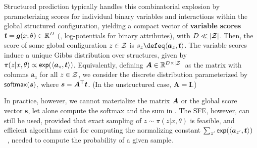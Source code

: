 Structured prediction typically handles this combinatorial explosion
by parameterizing scores for individual binary variables and
interactions within the global structured configuration, yielding a
compact vector of \textbf{variable scores} $\bm{t} = \g(x; \theta)
        \in \mathbb{R}^D$ (\eg, log-potentials for binary attributes), with
$D \ll |\ZZ|$. Then, the score of some global configuration $z \in
        \ZZ$ is $s_z \defeq \DP{\bm{a}_z}{\bm{t}}$. The variable scores
induce a unique Gibbs distribution over structures, given by
$\pi(z|x,\theta) \propto \exp(\DP{\bm{a}_{z}}{\bm{t}})$.
Equivalently, defining $\bm{A} \in \mathbb{R}^{D \times |\ZZ|}$ as
the matrix with columns $\bm{a}_{z}$ for all $z \in \ZZ$, we consider
the discrete distribution parameterized by $\softmax(\s)$, where
$\s=\bm{A}^\top \bm{t}$. (In the unstructured case, $\bm{A}=\bm{I}$.)

In practice, however, we cannot materialize the matrix $\AA$ or the
global score vector $\bm{s}$, let alone compute the softmax and the
sum in . The SFE, however, can still be used, provided
that exact sampling of $z\sim\pi(z | x, \theta)$ is feasible, and
efficient algorithms exist for computing the normalizing constant
$\sum_{z'}\exp(\DP{\bm{a}_{z'}}{\bm{t}})$~\citep{WJ2008}, needed to
compute the probability of a given sample.
